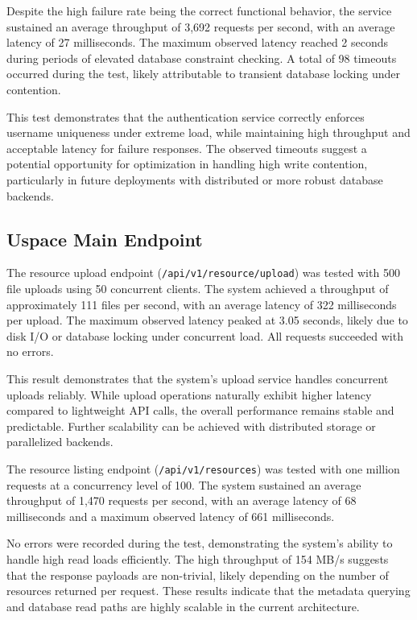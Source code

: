 Despite the high failure rate being the correct functional behavior, the service sustained 
an average throughput of 3,692 requests per second, with an average latency of 27 milliseconds. 
The maximum observed latency reached 2 seconds during periods of elevated database constraint 
checking. A total of 98 timeouts occurred during the test, likely attributable to transient 
database locking under contention.

This test demonstrates that the authentication service correctly enforces username uniqueness 
under extreme load, while maintaining high throughput and acceptable latency for failure 
responses. The observed timeouts suggest a potential opportunity for optimization in handling 
high write contention, particularly in future deployments with distributed or more robust 
database backends.


\subsection*{Uspace Main Endpoint}
The resource upload endpoint (\texttt{/api/v1/resource/upload}) was tested with 500 file 
uploads using 50 concurrent clients. The system achieved a throughput of approximately 111 
files per second, with an average latency of 322 milliseconds per upload. The maximum observed 
latency peaked at 3.05 seconds, likely due to disk I/O or database locking under concurrent load. 
All requests succeeded with no errors.

This result demonstrates that the system's upload service handles concurrent uploads reliably. 
While upload operations naturally exhibit higher latency compared to lightweight API calls, 
the overall performance remains stable and predictable. Further scalability can be achieved 
with distributed storage or parallelized backends.



The resource listing endpoint (\texttt{/api/v1/resources}) was tested with one million requests 
at a concurrency level of 100. The system sustained an average throughput of 1,470 requests per 
second, with an average latency of 68 milliseconds and a maximum observed latency of 661 
milliseconds.

No errors were recorded during the test, demonstrating the system's ability to handle high read 
loads efficiently. The high throughput of 154 MB/s suggests that the response payloads are 
non-trivial, likely depending on the number of resources returned per request. These results 
indicate that the metadata querying and database read paths are highly scalable in the current 
architecture.


